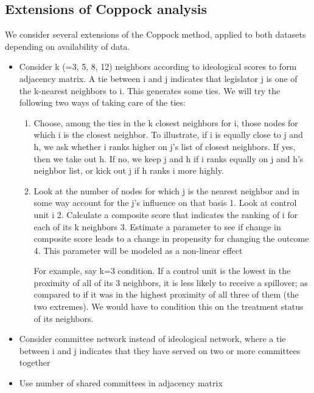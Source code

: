 \documentclass[12pt]{article}
\begin{document}
\subsection{Extensions of Coppock analysis}

We consider several extensions of the Coppock method, applied to both datasets depending on availability of data.

\begin{itemize}

\item Consider k (=3, 5, 8, 12) neighbors according to ideological scores to form adjacency matrix. A tie between i and j indicates that legislator j is one of the k-nearest neighbors to i. This generates some ties. We will try the following two ways of taking care of the ties:

\begin{enumerate}
\item Choose, among the ties in the k closest neighbors for i, those nodes for which i is the closest neighbor. To illustrate, if i is equally close to j and h, we ask whether i ranks higher on j's list of closest neighbors. If yes, then we take out h. If no, we keep j and h if i ranks equally on j and h's neighbor list, or kick out j if h ranks i more highly.

\item Look at the number of nodes for which j is the nearest neighbor and in some way account for the j's influence on that basis
1. Look at control unit i
2. Calculate a composite score that indicates the ranking of i for each of its k neighbors
3. Estimate a parameter to see if change in composite score leads to a change in propensity for changing the outcome
4. This parameter will be modeled as a non-linear effect

For example, say k=3 condition. If a control unit is the lowest in the proximity of all of its 3 neighbors, it is less likely to receive a spillover; as compared to if it was in the highest proximity of all three of them (the two extremes). We would have to condition this on the treatment status of its neighbors.
\end{enumerate}

\item Consider committee network instead of ideological network, where a tie between i and j indicates that they have served on two or more committees together

\item Use number of shared committees in adjacency matrix


\end{itemize}
\end{document}
